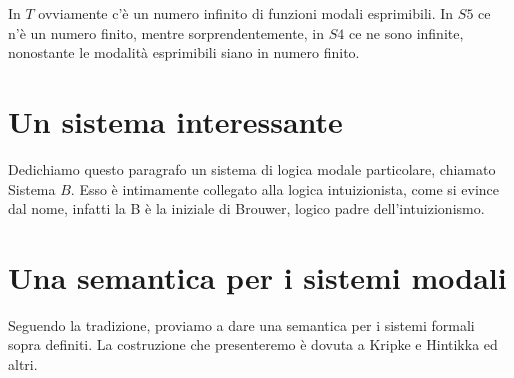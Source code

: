 \documentclass[a4paper, 12pt]{article}
\begin{document}
In $T$ ovviamente c'è un numero infinito di funzioni modali esprimibili.
In $S5$ ce n'è un numero finito, mentre sorprendentemente,
in $S4$ ce ne sono infinite, nonostante le modalità esprimibili siano in numero finito.

\section{Un sistema interessante}
Dedichiamo questo paragrafo un sistema di logica modale particolare, chiamato Sistema $B$.
Esso è intimamente collegato alla logica intuizionista, come si evince dal nome,
infatti la B è la iniziale di Brouwer, logico padre dell'intuizionismo.

\section{Una semantica per i sistemi modali}
Seguendo la tradizione, proviamo a dare una semantica per i sistemi formali sopra definiti.
La costruzione che presenteremo è dovuta a Kripke e Hintikka ed altri.
\end{document}
